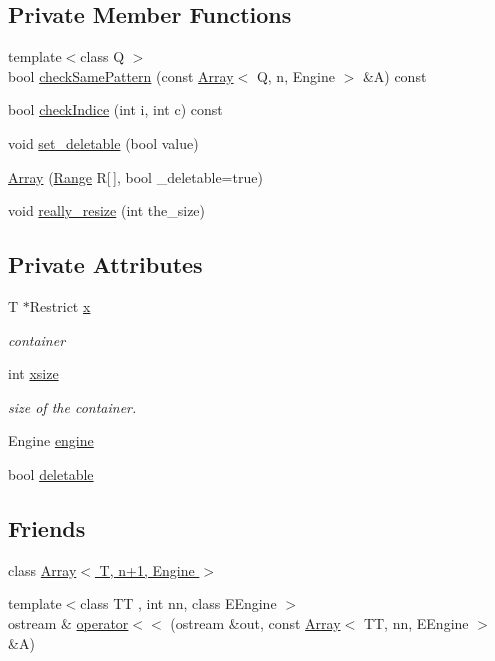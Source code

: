 \subsection*{Private Member Functions}
\begin{DoxyCompactItemize}
\item 
{\footnotesize template$<$class Q $>$ }\\bool \hyperlink{classArrays_1_1Array_a184a4d435943982212219b46ab36ce63}{check\+Same\+Pattern} (const \hyperlink{classArrays_1_1Array}{Array}$<$ Q, n, Engine $>$ \&A) const 
\item 
bool \hyperlink{classArrays_1_1Array_ac6b1045067347481cec44cc3031d9a98}{check\+Indice} (int i, int c) const 
\item 
void \hyperlink{classArrays_1_1Array_acfea5e543130a968c11980ec8f2d4d0a}{set\+\_\+deletable} (bool value)
\item 
\hyperlink{classArrays_1_1Array_acbd9b03e5b025115120f611fcbacb443}{Array} (\hyperlink{structArrays_1_1Range}{Range} R\mbox{[}$\,$\mbox{]}, bool \+\_\+deletable=true)
\item 
void \hyperlink{classArrays_1_1Array_ae30bbd334f64b89aa6fccbb299a9d432}{really\+\_\+resize} (int the\+\_\+size)
\end{DoxyCompactItemize}
\subsection*{Private Attributes}
\begin{DoxyCompactItemize}
\item 
T $\ast$Restrict \hyperlink{classArrays_1_1Array_aaf9eb3add119c03266706ad9e5efa539}{x}
\begin{DoxyCompactList}\small\item\em container \end{DoxyCompactList}\item 
int \hyperlink{classArrays_1_1Array_a5f845efc1be7986ebd3f8a7e57549b91}{xsize}
\begin{DoxyCompactList}\small\item\em size of the container. \end{DoxyCompactList}\item 
Engine \hyperlink{classArrays_1_1Array_a05278d5848221895775d5601800260aa}{engine}
\item 
bool \hyperlink{classArrays_1_1Array_a3594f356a6b8587ebe62c0066fd6bd0c}{deletable}
\end{DoxyCompactItemize}
\subsection*{Friends}
\begin{DoxyCompactItemize}
\item 
class \hyperlink{classArrays_1_1Array_a3fb4b0f3535fcde05b56e5841ae74b0e}{Array$<$ T, n+1, Engine $>$}
\item 
{\footnotesize template$<$class T\+T , int nn, class E\+Engine $>$ }\\ostream \& \hyperlink{classArrays_1_1Array_a741779db5da32d410fa4328605afd637}{operator$<$$<$} (ostream \&out, const \hyperlink{classArrays_1_1Array}{Array}$<$ T\+T, nn, E\+Engine $>$ \&A)
\end{DoxyCompactItemize}


